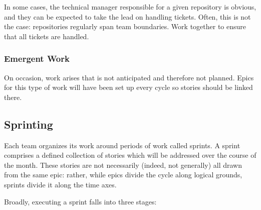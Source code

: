 In some cases, the technical manager responsible for a given repository
is obvious, and they can be expected to take the lead on handling
tickets. Often, this is not the case: repositories regularly span team
boundaries. Work together to ensure that all tickets are handled.

\subsubsection{Emergent Work}
\label{emergent-work}

On occasion, work arises that is not anticipated and therefore not planned.  Epics for this type of work will have been set up every \gls{cycle} so stories should be linked there.


\subsection{Sprinting}
\label{sec:sprinting}

Each team organizes its work around periods of work called sprints.
A sprint comprises a defined collection of stories which will be addressed over the course of the month.
These stories are not necessarily (indeed, not generally) all drawn from the same \gls{epic}: rather, while \glspl{epic} divide the \gls{cycle} along logical grounds, sprints divide it along the time axes.

Broadly, executing a sprint falls into three stages:

